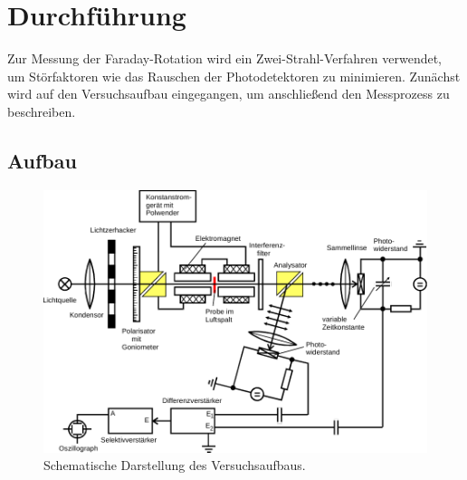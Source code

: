 \section{Durchführung}
\label{sec:durchfuehrung}

Zur Messung der Faraday-Rotation wird ein Zwei-Strahl-Verfahren verwendet,
um Störfaktoren wie das Rauschen der Photodetektoren zu minimieren.
Zunächst wird auf den Versuchsaufbau eingegangen,
um anschließend den Messprozess zu beschreiben.


\subsection{Aufbau}
\label{sec:durchfuehrung:aufbau}
\begin{figure}
    \centering
    \includegraphics[width=\textwidth]{content/img/Abb_1.pdf}
    \caption{Schematische Darstellung des Versuchsaufbaus.}
    \label{fig:aufbau}
\end{figure}


